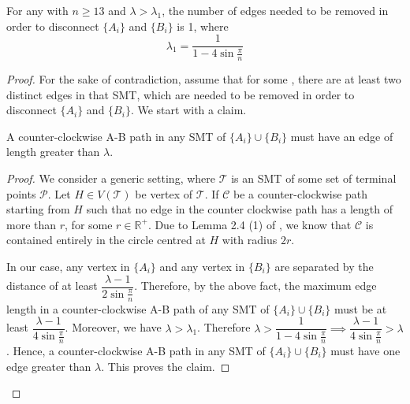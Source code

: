 \begin{lemma} \label{mincut_1}
    For any \smtpoly with $n \ge 13$ and $\lambda > \lambda_{1}$, the number of edges needed to be removed in order to disconnect $\{A_i\}$ and $\{B_i\}$ is 1, where 
    $$
    \lambda_{1} = \frac{1}{1 - 4 \sin \frac{\pi}{n}}
    $$
\end{lemma}

\begin{proof}
        For the sake of contradiction, assume that for some \smtpoly, there are at least two distinct edges in that SMT, which are needed to be removed in order to disconnect $\{A_i\}$ and $\{B_i\}$. We start with a claim.
        
        \begin{claim} \label{more_than_lambda}
        A counter-clockwise A-B path in any SMT of $\{A_i\} \cup \{B_i\}$ must have an edge of length greater than $\lambda$.
        \end{claim}
        
\begin{proof}
        We consider a generic setting, where $\mathcal T$ is an SMT of some set of terminal points $\mathcal P$. Let $H \in V(\mathcal T)$ be vertex of $\mathcal T$. If $\mathcal C$ be a counter-clockwise path starting from $H$ such that no edge in the counter clockwise path has a length of more than $r$, for some $r \in \mathbb{R}^{+}$. Due to Lemma 2.4 (1) of \cite{weng1995steiner},  we know that $\mathcal C$ is contained entirely in the circle centred at $H$ with radius $2r$.
        
        In our case, any vertex in $\{A_i\}$ and any vertex in $\{B_i\}$ are separated by the distance of at least $\dfrac{\lambda - 1}{2 \sin{\frac{\pi}{n}}}$. Therefore, by the above fact, the maximum edge length in a counter-clockwise A-B path of any SMT of $\{A_i\} \cup \{B_i\}$ must be at least $\dfrac{\lambda - 1}{4 \sin{\frac{\pi}{n}}}$. Moreover, we have $\lambda > \lambda_1$. Therefore $\lambda > \dfrac{1}{1 - 4 \sin{\frac{\pi}{n}}} \implies \dfrac{\lambda - 1}{4 \sin{\frac{\pi}{n}}} > \lambda$. Hence, a counter-clockwise A-B path in any SMT of $\{A_i\} \cup \{B_i\}$ must have one edge greater than $\lambda$. This proves the claim.
\end{proof}
        

\end{proof}
